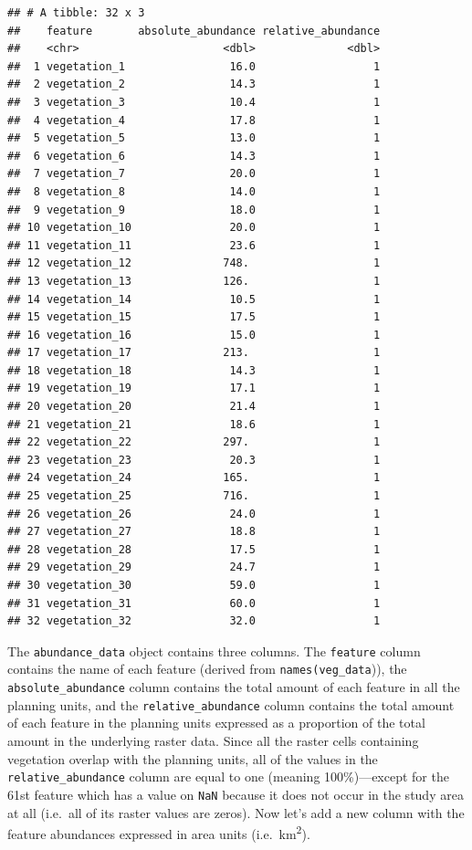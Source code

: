 \documentclass[12pt,]{book}
\begin{document}
\begin{verbatim}
## # A tibble: 32 x 3
##    feature       absolute_abundance relative_abundance
##    <chr>                      <dbl>              <dbl>
##  1 vegetation_1                16.0                  1
##  2 vegetation_2                14.3                  1
##  3 vegetation_3                10.4                  1
##  4 vegetation_4                17.8                  1
##  5 vegetation_5                13.0                  1
##  6 vegetation_6                14.3                  1
##  7 vegetation_7                20.0                  1
##  8 vegetation_8                14.0                  1
##  9 vegetation_9                18.0                  1
## 10 vegetation_10               20.0                  1
## 11 vegetation_11               23.6                  1
## 12 vegetation_12              748.                   1
## 13 vegetation_13              126.                   1
## 14 vegetation_14               10.5                  1
## 15 vegetation_15               17.5                  1
## 16 vegetation_16               15.0                  1
## 17 vegetation_17              213.                   1
## 18 vegetation_18               14.3                  1
## 19 vegetation_19               17.1                  1
## 20 vegetation_20               21.4                  1
## 21 vegetation_21               18.6                  1
## 22 vegetation_22              297.                   1
## 23 vegetation_23               20.3                  1
## 24 vegetation_24              165.                   1
## 25 vegetation_25              716.                   1
## 26 vegetation_26               24.0                  1
## 27 vegetation_27               18.8                  1
## 28 vegetation_28               17.5                  1
## 29 vegetation_29               24.7                  1
## 30 vegetation_30               59.0                  1
## 31 vegetation_31               60.0                  1
## 32 vegetation_32               32.0                  1
\end{verbatim}

The \texttt{abundance\_data} object contains three columns. The \texttt{feature} column contains the name of each feature (derived from \texttt{names(veg\_data})), the \texttt{absolute\_abundance} column contains the total amount of each feature in all the planning units, and the \texttt{relative\_abundance} column contains the total amount of each feature in the planning units expressed as a proportion of the total amount in the underlying raster data. Since all the raster cells containing vegetation overlap with the planning units, all of the values in the \texttt{relative\_abundance} column are equal to one (meaning 100\%)---except for the 61st feature which has a value on \texttt{NaN} because it does not occur in the study area at all (i.e.~all of its raster values are zeros). Now let's add a new column with the feature abundances expressed in area units (i.e.~km\textsuperscript{2}).
\end{document}
